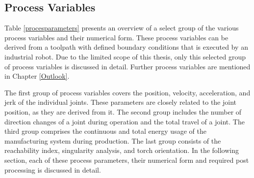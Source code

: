 \documentclass[conference]{IEEEtran}
\begin{document}
\subsection{Process Variables}\label{pp}

Table \ref{procesparameters} presents an overview of a select group of the various process variables and their numerical form. These process variables can be derived from a toolpath with defined boundary conditions that is executed by an industrial robot. Due to the limited scope of this thesis, only this selected group of process variables is discussed in detail. Further process variables are mentioned in Chapter \ref{Outlook}.

The first group of process variables covers the position, velocity, acceleration, and jerk of the individual joints. These parameters are closely related to the joint position, as they are derived from it. The second group includes the number of direction changes of a joint during operation and the total travel of a joint. The third group comprises the continuous and total energy usage of the manufacturing system during production. The last group consists of the reachability index, singularity analysis, and torch orientation. In the following section, each of these process parameters, their numerical form and required post processing is discussed in detail.
\end{document}
